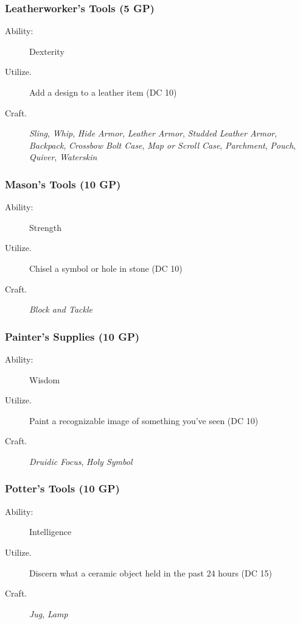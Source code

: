 \documentclass[10pt,a4paper,twoside,bg=print,twocolumn,openany,nodeprecatedcode]{dndbook}
\begin{document}
\subsubsection{Leatherworker's Tools (5 GP)}

\begin{description}
\item[Ability:]
Dexterity
\item[Utilize.]
Add a design to a leather item (DC 10)
\item[Craft.]
\textit{Sling}, \textit{Whip}, \textit{Hide Armor}, \textit{Leather Armor}, \textit{Studded Leather Armor}, \textit{Backpack}, \textit{Crossbow Bolt Case}, \textit{Map or Scroll Case}, \textit{Parchment}, \textit{Pouch}, \textit{Quiver}, \textit{Waterskin}
\end{description}

\subsubsection{Mason's Tools (10 GP)}

\begin{description}
\item[Ability:]
Strength
\item[Utilize.]
Chisel a symbol or hole in stone (DC 10)
\item[Craft.]
\textit{Block and Tackle}
\end{description}

\subsubsection{Painter's Supplies (10 GP)}

\begin{description}
\item[Ability:]
Wisdom
\item[Utilize.]
Paint a recognizable image of something you've seen (DC 10)
\item[Craft.]
\textit{Druidic Focus}, \textit{Holy Symbol}
\end{description}

\subsubsection{Potter's Tools (10 GP)}

\begin{description}
\item[Ability:]
Intelligence
\item[Utilize.]
Discern what a ceramic object held in the past 24 hours (DC 15)
\item[Craft.]
\textit{Jug}, \textit{Lamp}
\end{description}
\end{document}
